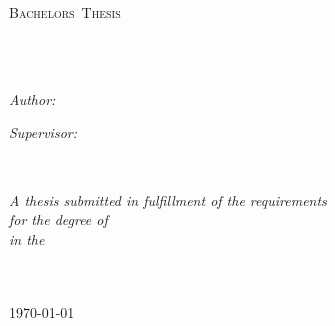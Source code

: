\documentclass[
11pt, %
english, %
singlespacing, %
parskip, %
headsepline, %
]{MastersDoctoralThesis} %
\author{Max \textsc{Mustermann}} %
\newcommand{\thesistype}{Bachelors} %
\begin{document}
\frontmatter %

\pagestyle{plain} %


\begin{titlepage}
\begin{center}

\vspace*{.06\textheight}
{\scshape\LARGE \univname\par}\vspace{1.5cm} %
\textsc{\Large \thesistype~Thesis}\\[0.5cm] %

\HRule \\[0.4cm] %
{\huge \bfseries \ttitle\par}\vspace{0.4cm} %
\HRule \\[1.5cm] %

\begin{minipage}[t]{0.4\textwidth}
\begin{flushleft} \large
\emph{Author:}\\
\authorname
\end{flushleft}
\end{minipage}
\begin{minipage}[t]{0.4\textwidth}
\begin{flushright} \large
\emph{Supervisor:} \\
\supname
\end{flushright}
\end{minipage}\\[3cm]

\vfill

\large \textit{A thesis submitted in fulfillment of the requirements\\ for the degree of \degreename}\\[0.3cm] %
\textit{in the}\\[0.4cm]
\groupname\\\deptname\\[2cm] %

\vfill

{\large \today}\\[4cm] %

\vfill
\end{center}
\end{titlepage}
\end{document}
